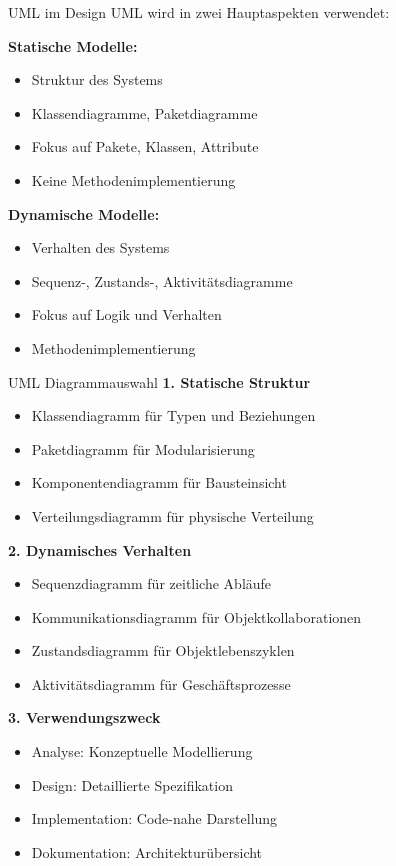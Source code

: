 \begin{concept}{UML im Design}
UML wird in zwei Hauptaspekten verwendet:

\textbf{Statische Modelle:}
\begin{itemize}
    \item Struktur des Systems
    \item Klassendiagramme, Paketdiagramme
    \item Fokus auf Pakete, Klassen, Attribute
    \item Keine Methodenimplementierung
\end{itemize}

\textbf{Dynamische Modelle:}
\begin{itemize}
    \item Verhalten des Systems
    \item Sequenz-, Zustands-, Aktivitätsdiagramme
    \item Fokus auf Logik und Verhalten
    \item Methodenimplementierung
\end{itemize}
\end{concept}

\begin{KR}{UML Diagrammauswahl}
\textbf{1. Statische Struktur}
\begin{itemize}
    \item Klassendiagramm für Typen und Beziehungen
    \item Paketdiagramm für Modularisierung
    \item Komponentendiagramm für Bausteinsicht
    \item Verteilungsdiagramm für physische Verteilung
\end{itemize}

\textbf{2. Dynamisches Verhalten}
\begin{itemize}
    \item Sequenzdiagramm für zeitliche Abläufe
    \item Kommunikationsdiagramm für Objektkollaborationen
    \item Zustandsdiagramm für Objektlebenszyklen
    \item Aktivitätsdiagramm für Geschäftsprozesse
\end{itemize}

\textbf{3. Verwendungszweck}
\begin{itemize}
    \item Analyse: Konzeptuelle Modellierung
    \item Design: Detaillierte Spezifikation
    \item Implementation: Code-nahe Darstellung
    \item Dokumentation: Architekturübersicht
\end{itemize}
\end{KR}

